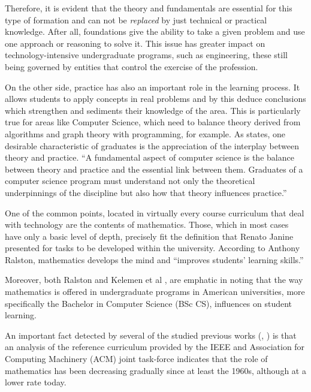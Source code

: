 \documentclass[conference]{IEEEtran}
\begin{document}
	Therefore, it is evident that the theory and fundamentals are essential for this type of formation and can not be \emph{replaced} by just technical or practical knowledge. After all, foundations give the ability to take a given problem and use one approach or reasoning to solve it. This issue has greater impact on technology-intensive undergraduate programs, such as engineering, these still being governed by entities that control the exercise of the profession.

	On the other side, practice has also an important role in the learning process. It allows students to apply concepts in real problems and by this deduce conclusions which strengthen and sediments their knowledge of the area. This is particularly true for areas like Computer Science, which need to balance theory derived from algorithms and graph theory with programming, for example. As \cite{cs2008} states, one desirable characteristic of graduates is the appreciation of the interplay between theory and practice. ``A fundamental aspect of computer science is the balance between theory and practice and the essential link between them. Graduates of a computer science program must understand not only the theoretical underpinnings of the discipline but also how that theory influences practice.''

	One of the common points, located in virtually every course curriculum that deal with technology are the contents of mathematics. Those, which in most cases have only a basic level of depth, precisely fit the definition that Renato Janine presented for tasks to be developed within the university. According to Anthony Ralston, mathematics develops the mind and ``improves students' learning skills.'' \cite{ralston:do_need_mathematics}

	Moreover, both Ralston and Kelemen et al \cite{kelemen:has_become_math_phobic}, are emphatic in noting that the way mathematics is offered in undergraduate programs in American universities, more specifically the Bachelor in Computer Science (BSc CS), influences on student learning.

	An important fact detected by several of the studied previous works (\cite{ralston:do_need_mathematics}, \cite{tucker:our_curriculum_math_phobic}) is that an analysis of the reference curriculum provided by the IEEE and Association for Computing Machinery (ACM) joint task-force \cite{cs2001} \cite{cs2008} indicates that the role of mathematics has been decreasing gradually since at least the 1960s, although at a lower rate today.
\end{document}
